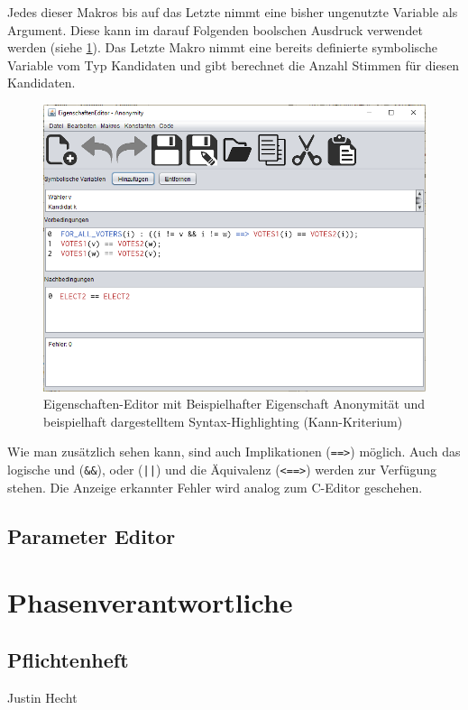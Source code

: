 \documentclass[a4paper]{scrreprt}
\begin{document}
Jedes dieser Makros bis auf das Letzte nimmt eine bisher ungenutzte Variable als Argument. Diese kann im darauf Folgenden boolschen Ausdruck verwendet werden (siehe \ref{Eigenschaften-Editor-Anonymität}). Das Letzte Makro nimmt eine bereits definierte symbolische Variable vom Typ Kandidaten und gibt berechnet die Anzahl Stimmen für diesen Kandidaten.

\begin{figure}[H]
\includegraphics[scale=0.5]{Editor-vor-und-nachbedingungen-syntax-highlighting.png}
\caption{Eigenschaften-Editor mit Beispielhafter Eigenschaft Anonymität und beispielhaft dargestelltem Syntax-Highlighting (Kann-Kriterium)}
\label{Eigenschaften-Editor-Anonymität}
\end{figure}

Wie man zusätzlich sehen kann, sind auch Implikationen (\verb!==>!) möglich. Auch das logische und (\verb!&&!), oder (\verb!||!) und die Äquivalenz (\verb!<==>!) werden zur Verfügung stehen. Die Anzeige erkannter Fehler wird analog zum C-Editor geschehen.

\section{Parameter Editor}

\chapter{Phasenverantwortliche}
\section{Pflichtenheft} Justin Hecht
\end{document}
